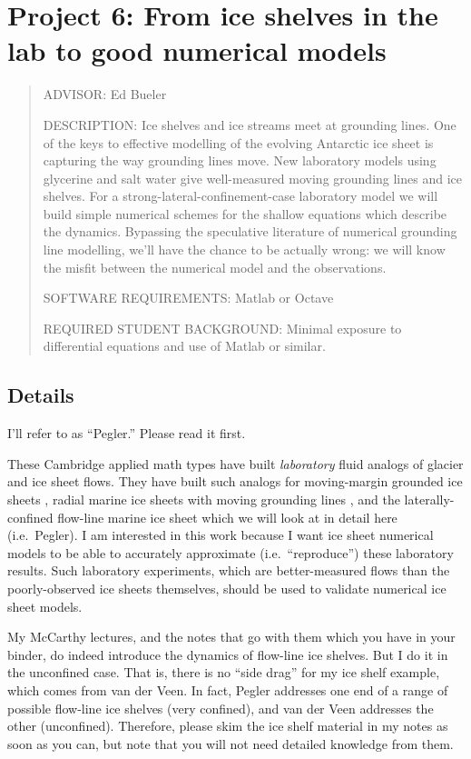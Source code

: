 \documentclass[11pt,final]{amsart}%
\begin{document}
\newpage
\section*{Project 6: From ice shelves in the lab to good numerical models}

\begin{quote}
\noindent ADVISOR: Ed Bueler

\medskip
\noindent DESCRIPTION:  Ice shelves and ice streams meet at grounding lines.  One of the keys to effective modelling of the evolving Antarctic ice sheet is capturing the way grounding lines move.  New laboratory models using glycerine and salt water give well-measured moving grounding lines and ice shelves.  For a strong-lateral-confinement-case laboratory model \citep{Pegleretal2013} we will build simple numerical schemes for the shallow equations which describe the dynamics.  Bypassing the speculative literature of numerical grounding line modelling, we'll have the chance to be actually wrong: we will know the misfit between the numerical model and the observations.

\medskip
\noindent SOFTWARE REQUIREMENTS: Matlab or Octave

\medskip
\noindent REQUIRED STUDENT BACKGROUND: Minimal exposure to differential equations and use of Matlab or similar.
\end{quote}

\subsection*{Details}  I'll refer to  \cite{Pegleretal2013} as ``Pegler.''  Please read it first.

These Cambridge applied math types have built \emph{laboratory} fluid analogs of glacier and ice sheet flows.  They have built such analogs for moving-margin grounded ice sheets \citep{SayagWorster2013}, radial marine ice sheets with moving grounding lines \citep{PeglerWorster2012,SayagPeglerWorster2012}, and the laterally-confined flow-line marine ice sheet which we will look at in detail here (i.e.~Pegler).  I am interested in this work because I want ice sheet numerical models to be able to accurately approximate (i.e.~``reproduce'') these laboratory results.  Such laboratory experiments, which are better-measured flows than the poorly-observed ice sheets themselves, should be used to validate numerical ice sheet models.

My McCarthy lectures, and the notes that go with them which you have in your binder, do indeed introduce the dynamics of flow-line ice shelves.  But I do it in the unconfined case.  That is, there is no ``side drag'' for my ice shelf example, which comes from van der Veen.  In fact, Pegler addresses one end of a range of possible flow-line ice shelves (very confined), and van der Veen addresses the other (unconfined).  Therefore, please skim the ice shelf material in my notes as soon as you can, but note that you will not need detailed knowledge from them.
\end{document}
